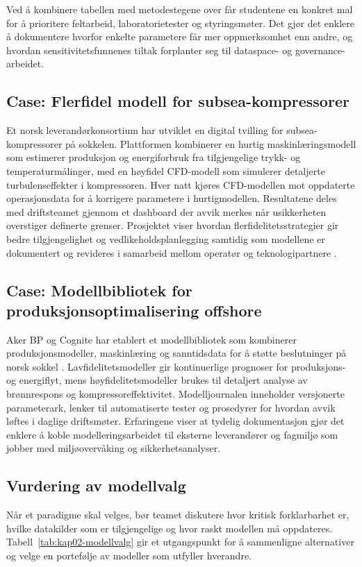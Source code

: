 Ved å kombinere tabellen med metodestegene over får studentene en konkret mal for å prioritere feltarbeid, laboratorietester og
styringsmøter. Det gjør det enklere å dokumentere hvorfor enkelte parametere får mer oppmerksomhet enn andre, og hvordan
sensitivitetsfunnenes tiltak forplanter seg til dataspace- og governance-arbeidet.

\subsection{Case: Flerfidel modell for subsea-kompressorer}
Et norsk leverandørkonsortium har utviklet en digital tvilling for subsea-kompressorer på sokkelen. Plattformen kombinerer en
hurtig maskinlæringsmodell som estimerer produksjon og energiforbruk fra tilgjengelige trykk- og temperaturmålinger, med en
høyfidel CFD-modell som simulerer detaljerte turbulenseffekter i kompressoren. Hver natt kjøres CFD-modellen mot oppdaterte
operasjonsdata for å korrigere parametere i hurtigmodellen. Resultatene deles med driftsteamet gjennom et dashboard der
avvik merkes når usikkerheten overstiger definerte grenser. Prosjektet viser hvordan flerfidelitetsstrategier gir bedre
tilgjengelighet og vedlikeholdsplanlegging samtidig som modellene er dokumentert og revideres i samarbeid mellom operatør og
teknologipartnere \citep{sintef2021digital}.

\subsection{Case: Modellbibliotek for produksjonsoptimalisering offshore}
Aker BP og Cognite har etablert et modellbibliotek som kombinerer produksjonsmodeller, maskinlæring og sanntidsdata for å støtte
beslutninger på norsk sokkel \citep{cognite2023akerbp}. Lavfidelitetsmodeller gir kontinuerlige prognoser for produksjons- og
energiflyt, mens høyfidelitetsmodeller brukes til detaljert analyse av brønnrespons og kompressoreffektivitet. Modelljournalen
inneholder versjonerte parameterark, lenker til automatiserte tester og prosedyrer for hvordan avvik løftes i daglige
driftsmøter. Erfaringene viser at tydelig dokumentasjon gjør det enklere å koble modelleringsarbeidet til eksterne leverandører
og fagmiljø som jobber med miljøovervåking og sikkerhetsanalyser.

\subsection{Vurdering av modellvalg}
Når et paradigme skal velges, bør teamet diskutere hvor kritisk forklarbarhet er, hvilke datakilder som er tilgjengelige og hvor
raskt modellen må oppdateres. Tabell~\ref{tab:kap02-modellvalg} gir et utgangspunkt for å sammenligne alternativer og velge en
portefølje av modeller som utfyller hverandre.

